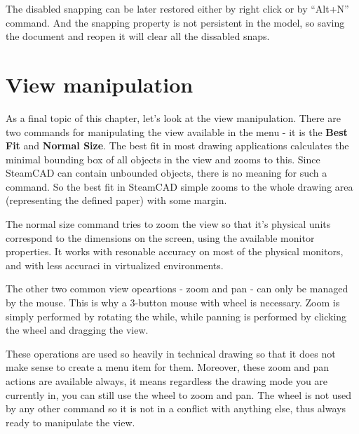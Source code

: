 The disabled snapping can be later restored either by right click or by ``Alt+N'' command.
And the snapping property is not persistent in the model, so saving the document and reopen
it will clear all the dissabled snaps.

\section{View manipulation}

As a final topic of this chapter, let's look at the view manipulation. There are two commands
for manipulating the view available in the menu - it is the \textbf{Best Fit} and
\textbf{Normal Size}. The best fit in most drawing applications calculates the minimal bounding
box of all objects in the view and zooms to this. Since SteamCAD can contain unbounded objects,
there is no meaning for such a command. So the best fit in SteamCAD simple zooms to the whole
drawing area (representing the defined paper) with some margin.

The normal size command tries to zoom the view so that it's physical units correspond to the
dimensions on the screen, using the available monitor properties. It works with resonable
accuracy on most of the physical monitors, and with less accuraci in virtualized environments.

The other two common view opeartions - zoom and pan - can only be managed by the mouse.
This is why a 3-button mouse with wheel is necessary. Zoom is simply performed by rotating
the while, while panning is performed by clicking the wheel and dragging the view.

These operations are used so heavily in technical drawing so that it does not make sense
to create a menu item for them. Moreover, these zoom and pan actions are available always,
it means regardless the drawing mode you are currently in, you can still use the wheel
to zoom and pan. The wheel is not used by any other command so it is not in a conflict
with anything else, thus always ready to manipulate the view.

